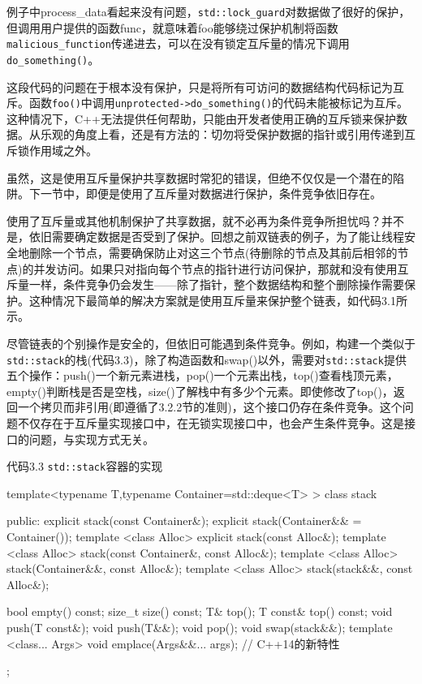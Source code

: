 例子中process\_data看起来没有问题，\texttt{std::lock\_guard}对数据做了很好的保护，但调用用户提供的函数func，就意味着foo能够绕过保护机制将函数\texttt{malicious\_function}传递进去，可以在没有锁定互斥量的情况下调用\texttt{do\_something()}。

这段代码的问题在于根本没有保护，只是将所有可访问的数据结构代码标记为互斥。函数\texttt{foo()}中调用\texttt{unprotected->do\_something()}的代码未能被标记为互斥。这种情况下，C++无法提供任何帮助，只能由开发者使用正确的互斥锁来保护数据。从乐观的角度上看，还是有方法的：切勿将受保护数据的指针或引用传递到互斥锁作用域之外。

虽然，这是使用互斥量保护共享数据时常犯的错误，但绝不仅仅是一个潜在的陷阱。下一节中，即便是使用了互斥量对数据进行保护，条件竞争依旧存在。


使用了互斥量或其他机制保护了共享数据，就不必再为条件竞争所担忧吗？并不是，依旧需要确定数据是否受到了保护。回想之前双链表的例子，为了能让线程安全地删除一个节点，需要确保防止对这三个节点(待删除的节点及其前后相邻的节点)的并发访问。如果只对指向每个节点的指针进行访问保护，那就和没有使用互斥量一样，条件竞争仍会发生——除了指针，整个数据结构和整个删除操作需要保护。这种情况下最简单的解决方案就是使用互斥量来保护整个链表，如代码3.1所示。

尽管链表的个别操作是安全的，但依旧可能遇到条件竞争。例如，构建一个类似于\texttt{std::stack}的栈(代码3.3)，除了构造函数和swap()以外，需要对\texttt{std::stack}提供五个操作：push()一个新元素进栈，pop()一个元素出栈，top()查看栈顶元素，empty()判断栈是否是空栈，size()了解栈中有多少个元素。即使修改了top()，返回一个拷贝而非引用(即遵循了3.2.2节的准则)，这个接口仍存在条件竞争。这个问题不仅存在于互斥量实现接口中，在无锁实现接口中，也会产生条件竞争。这是接口的问题，与实现方式无关。

代码3.3 \texttt{std::stack}容器的实现

\begin{cpp}
template<typename T,typename Container=std::deque<T> >
class stack
{
public:
  explicit stack(const Container&);
  explicit stack(Container&& = Container());
  template <class Alloc> explicit stack(const Alloc&);
  template <class Alloc> stack(const Container&, const Alloc&);
  template <class Alloc> stack(Container&&, const Alloc&);
  template <class Alloc> stack(stack&&, const Alloc&);

  bool empty() const;
  size_t size() const;
  T& top();
  T const& top() const;
  void push(T const&);
  void push(T&&);
  void pop();
  void swap(stack&&);
  template <class... Args> void emplace(Args&&... args); // C++14的新特性
};
\end{cpp}

